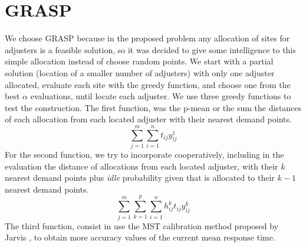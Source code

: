 \section{GRASP}
We choose GRASP
because
in the proposed problem
any allocation of sites for adjusters
is a feasible solution,
so it was decided to give some intelligence
to this simple allocation
instead of choose
random points.
We start with a partial solution
(location of a smaller number of adjusters)
with only one adjuster allocated,
evaluate each site with the greedy function,
and choose one from the best $\alpha$ evaluations,
until locate each adjuster.
We use three greedy functions
to test the construction.
The first function,
was the p-mean
or the sum the distances
of each allocation 
from each located adjuster
with their nearest demand points.
\begin{equation}
  \label{eq:grasp1}
  \sum_{j=1}^{m}{
    \sum_{i=1}^{n}{
      t_{ij}y_{ij}^{1}
    }
  }
\end{equation}
For the second function,
we try to incorporate cooperatively,
including in the evaluation
the distance of allocations
from each located adjuster,
with their $k$ nearest demand points
plus \textit{idle} probability
given that is allocated
to their $k-1$ nearest demand points.
\begin{equation}
  \label{eq:grasp2}
  \sum_{j=1}^{m}{
    \sum_{k=1}^{p}{
      \sum_{i=1}^{n}{
        h_{ij}^{k}t_{ij}y_{ij}^{k}
      }
    }
  }
\end{equation}
The third function,
consist in use the MST calibration method
proposed by Jarvis \cite{jarvis1985approximating},
to obtain more accuracy values
of the current mean response time.
